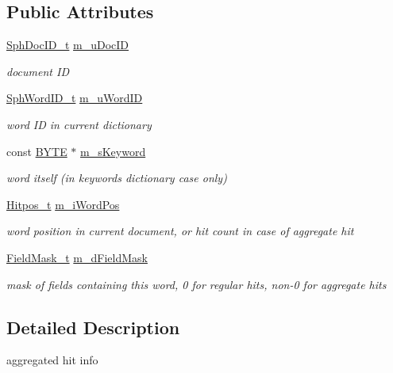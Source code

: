 \subsection*{Public Attributes}
\begin{DoxyCompactItemize}
\item 
\hyperlink{sphinx_8h_a3176771631c12a9e4897272003e6b447}{Sph\-Doc\-I\-D\-\_\-t} \hyperlink{structCSphAggregateHit_aebd6323792225cc1ccdbd29cd841fe1f}{m\-\_\-u\-Doc\-I\-D}
\begin{DoxyCompactList}\small\item\em document I\-D \end{DoxyCompactList}\item 
\hyperlink{sphinx_8h_a80a94d5984fdf9214a98f3e5e65df963}{Sph\-Word\-I\-D\-\_\-t} \hyperlink{structCSphAggregateHit_aebbf4230647af0e336746ce7dcc9e77c}{m\-\_\-u\-Word\-I\-D}
\begin{DoxyCompactList}\small\item\em word I\-D in current dictionary \end{DoxyCompactList}\item 
const \hyperlink{sphinxstd_8h_a4ae1dab0fb4b072a66584546209e7d58}{B\-Y\-T\-E} $\ast$ \hyperlink{structCSphAggregateHit_aa66adfd392df1239428349d0c9a78349}{m\-\_\-s\-Keyword}
\begin{DoxyCompactList}\small\item\em word itself (in keywords dictionary case only) \end{DoxyCompactList}\item 
\hyperlink{sphinx_8h_af1385e83d53e0648b15eae6d8f101847}{Hitpos\-\_\-t} \hyperlink{structCSphAggregateHit_a99f49fe08e3fb20ee11c5217803067b3}{m\-\_\-i\-Word\-Pos}
\begin{DoxyCompactList}\small\item\em word position in current document, or hit count in case of aggregate hit \end{DoxyCompactList}\item 
\hyperlink{structFieldMask__t}{Field\-Mask\-\_\-t} \hyperlink{structCSphAggregateHit_a87b97f5d6e3838790db7ef4773eeac67}{m\-\_\-d\-Field\-Mask}
\begin{DoxyCompactList}\small\item\em mask of fields containing this word, 0 for regular hits, non-\/0 for aggregate hits \end{DoxyCompactList}\end{DoxyCompactItemize}


\subsection{Detailed Description}
aggregated hit info 


